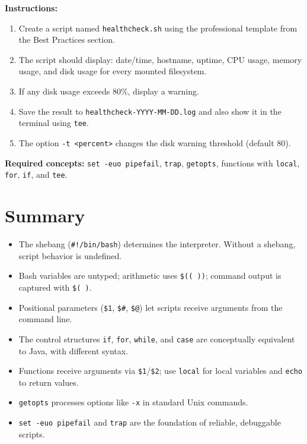 \textbf{Instructions:}
\begin{enumerate}
  \item Create a script named \texttt{healthcheck.sh} using the professional
    template from the Best Practices section.
  \item The script should display: date/time, hostname, uptime, CPU usage,
    memory usage, and disk usage for every mounted filesystem.
  \item If any disk usage exceeds 80\%, display a warning.
  \item Save the result to \texttt{healthcheck-YYYY-MM-DD.log} and also show
    it in the terminal using \texttt{tee}.
  \item The option \texttt{-t <percent>} changes the disk warning threshold
    (default 80).
\end{enumerate}

\textbf{Required concepts:} \texttt{set -euo pipefail}, \texttt{trap},
\texttt{getopts}, functions with \texttt{local}, \texttt{for},
\texttt{if}, and \texttt{tee}.

\section{Summary}
\label{sec:summary-bash-prog}

\begin{itemize}
  \item The shebang (\texttt{\#!/bin/bash}) determines the interpreter.
    Without a shebang, script behavior is undefined.
  \item Bash variables are untyped; arithmetic uses \texttt{\$(( ))}; command
    output is captured with \texttt{\$( )}.
  \item Positional parameters (\texttt{\$1}, \texttt{\$\#}, \texttt{\$@})
    let scripts receive arguments from the command line.
  \item The control structures \texttt{if}, \texttt{for}, \texttt{while},
    and \texttt{case} are conceptually equivalent to Java, with different
    syntax.
  \item Functions receive arguments via \texttt{\$1}/\texttt{\$2}; use
    \texttt{local} for local variables and \texttt{echo} to return values.
  \item \texttt{getopts} processes options like \texttt{-x} in standard Unix
    commands.
  \item \texttt{set -euo pipefail} and \texttt{trap} are the foundation of
    reliable, debuggable scripts.
\end{itemize}

%
